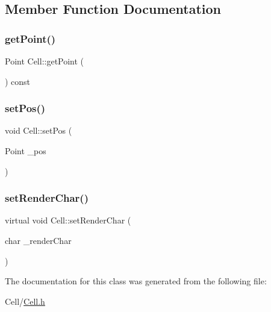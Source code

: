 \subsection{Member Function Documentation}
\mbox{\label{classCell_adb435a236584c42c0ffc77b67e2decc7}} 
\subsubsection{\texorpdfstring{getPoint()}{getPoint()}}
{\footnotesize\ttfamily Point Cell\+::get\+Point (\begin{DoxyParamCaption}{ }\end{DoxyParamCaption}) const}

\mbox{\label{classCell_a2bf0de61827c10b7153dcebb84b47988}} 
\subsubsection{\texorpdfstring{setPos()}{setPos()}}
{\footnotesize\ttfamily void Cell\+::set\+Pos (\begin{DoxyParamCaption}\item[{Point}]{\+\_\+pos }\end{DoxyParamCaption})}

\mbox{\label{classCell_af53171630c52051a690d6f68329ea58e}} 
\subsubsection{\texorpdfstring{setRenderChar()}{setRenderChar()}}
{\footnotesize\ttfamily virtual void Cell\+::set\+Render\+Char (\begin{DoxyParamCaption}\item[{char}]{\+\_\+render\+Char }\end{DoxyParamCaption})\hspace{0.3cm}{\ttfamily [virtual]}}



The documentation for this class was generated from the following file\+:\begin{DoxyCompactItemize}
\item 
Cell/\mbox{\hyperlink{Cell_8h}{Cell.\+h}}\end{DoxyCompactItemize}
